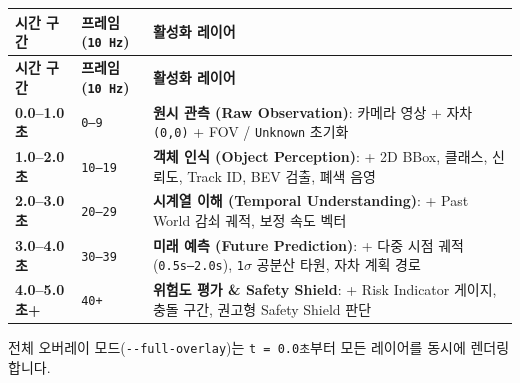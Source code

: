 \documentclass[10.5pt,a4paper]{article}
\begin{document}
\begin{footnotesize}
\setlength{\tabcolsep}{4pt}
\setlength{\LTleft}{0pt}\setlength{\LTright}{0pt}
\begin{longtable}{>{\raggedright\arraybackslash}p{} >{\raggedright\arraybackslash}p{} >{\raggedright\arraybackslash}p{}}
\toprule
\textbf{시간 구간} & \textbf{프레임 (\texttt{10 Hz})} & \textbf{활성화 레이어} \\
\midrule
\endfirsthead
\toprule
\textbf{시간 구간} & \textbf{프레임 (\texttt{10 Hz})} & \textbf{활성화 레이어} \\
\midrule
\endhead
\bottomrule
\endfoot
\textbf{0.0--1.0초} & \texttt{0--9} & \textbf{원시 관측 (Raw Observation)}: 카메라 영상 + 자차 \texttt{(0,\allowbreak{}0)} + FOV / \texttt{Unknown} 초기화 \\
\textbf{1.0--2.0초} & \texttt{10--19} & \textbf{객체 인식 (Object Perception)}: + 2D BBox, 클래스, 신뢰도, Track ID, BEV 검출, 폐색 음영 \\
\textbf{2.0--3.0초} & \texttt{20--29} & \textbf{시계열 이해 (Temporal Understanding)}: + Past World 감쇠 궤적, 보정 속도 벡터 \\
\textbf{3.0--4.0초} & \texttt{30--39} & \textbf{미래 예측 (Future Prediction)}: + 다중 시점 궤적(\texttt{0.\allowbreak{}5s--2.\allowbreak{}0s}), \texttt{1$\sigma$} 공분산 타원, 자차 계획 경로 \\
\textbf{4.0--5.0초+} & \texttt{40+} & \textbf{위험도 평가 \& Safety Shield}: + Risk Indicator 게이지, 충돌 구간, 권고형 Safety Shield 판단 \\
\end{longtable}
\end{footnotesize}


전체 오버레이 모드(\texttt{-\allowbreak{}-\allowbreak{}full-\allowbreak{}overlay})는 \texttt{t = 0.\allowbreak{}0초}부터 모든 레이어를 동시에 렌더링합니다.
\end{document}

